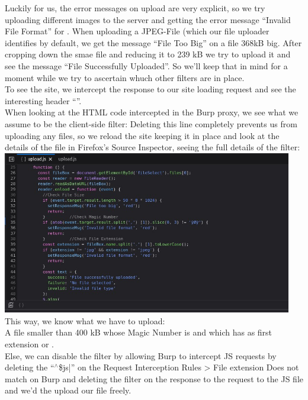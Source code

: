 {{Luckily for us, the error messages on upload are very explicit, so we try uploading different images to the server and getting the error message ``Invalid File Format'' for . When uploading a JPEG-File (which our file uploader identifies by default, we get the message ``File Too Big'' on a file 368kB big. After cropping down the smae file and reducing it to 239 kB we try to upload it and see the message ``File Successfully Uploaded''. So we'll keep that in mind for a moment while we try to ascertain whuch other filters are in place.\\
To see the site, we intercept the response to our site loading request and see the interesting header ``''.\\
When looking at the HTML code intercepted in the Burp proxy, we see what we assume to be the client-side filter: 
Deleting this line completely prevents us from uploading any files, so we reload the site keeping it in place and look at the details of the file in Firefox's Source Inspector, seeing the full details of the filter:\\
\includegraphics[width=0.95\textwidth]{Complete_Beginner_Path/Web_Hacking_Fundamentals_Room/UploadVulns/Client_side_filter.jpg}
This way, we know what we have to upload:\\
A file smaller than 400 kB whose Magic Number is   and which has as first extension  or .\\
Else, we can disable the filter by allowing Burp to intercept JS requests by deleting the ``$^\wedge$\$js|'' on the Request Interception Rules > File extension Does not match on Burp and deleting the filter on the response to the request to the JS file  and we'd the upload our file freely.\\

}}
